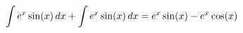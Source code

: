 \documentclass[preview]{standalone}
\begin{document}
\begin{align*}
\special{dvisvgm:raw <g id='unique000'>}\int e^x \sin(x) \, dx + \int e^x \sin(x) \, dx = e^x \sin(x) - e^x \cos(x)\special{dvisvgm:raw </g>}
\end{align*}
\end{document}
